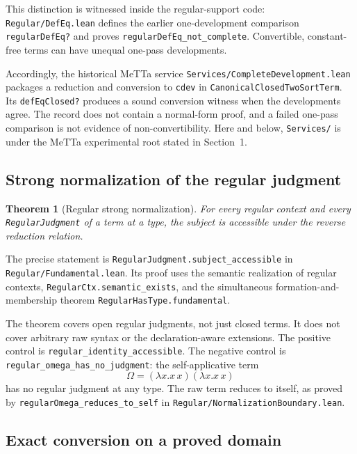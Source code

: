 \documentclass[11pt]{article}
\newtheorem{theorem}{Theorem}[section]
\newcommand{\code}[1]{\nolinkurl{#1}}
\begin{document}
This distinction is witnessed inside the regular-support code:
\code{Regular/DefEq.lean} defines the earlier one-development comparison
\code{regularDefEq?} and proves \code{regularDefEq_not_complete}.
Convertible, constant-free terms can have unequal one-pass developments.

Accordingly, the historical MeTTa service
\code{Services/CompleteDevelopment.lean} packages a reduction and conversion
to \code{cdev} in \code{CanonicalClosedTwoSortTerm}.
Its \code{defEqClosed?} produces a sound conversion witness when the
developments agree. The record does not contain a normal-form proof, and a
failed one-pass comparison is not evidence of non-convertibility.
Here and below, \code{Services/} is under the MeTTa experimental root stated
in Section~1.

\subsection{Strong normalization of the regular judgment}

\begin{theorem}[Regular strong normalization]
For every regular context and every
\code{RegularJudgment} of a term at a type, the subject is accessible under
the reverse reduction relation.
\end{theorem}
\noindent
The precise statement is \code{RegularJudgment.subject_accessible} in
\code{Regular/Fundamental.lean}. Its proof uses the semantic realization of
regular contexts, \code{RegularCtx.semantic_exists}, and the simultaneous
formation-and-membership theorem \code{RegularHasType.fundamental}.

The theorem covers open regular judgments, not just closed terms.
It does not cover arbitrary raw syntax or the declaration-aware extensions.
The positive control is \code{regular_identity_accessible}.
The negative control is \code{regular_omega_has_no_judgment}: the
self-applicative term
\[
  \Omega=(\lambda x.x\,x)(\lambda x.x\,x)
\]
has no regular judgment at any type.
The raw term reduces to itself, as proved by
\code{regularOmega_reduces_to_self} in
\code{Regular/NormalizationBoundary.lean}.

\subsection{Exact conversion on a proved domain}
\end{document}
